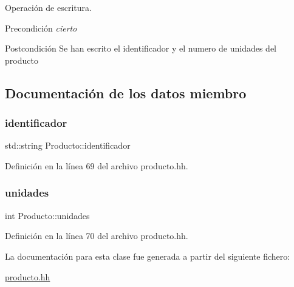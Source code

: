 Operación de escritura. 

\begin{DoxyPrecond}{Precondición}
{\itshape cierto} 
\end{DoxyPrecond}
\begin{DoxyPostcond}{Postcondición}
Se han escrito el identificador y el numero de unidades del producto 
\end{DoxyPostcond}


\subsection{Documentación de los datos miembro}
\mbox{\label{class_producto_a522892e64ad72444f1976ae86b2c2816}} 
\subsubsection{\texorpdfstring{identificador}{identificador}}
{\footnotesize\ttfamily std\+::string Producto\+::identificador\hspace{0.3cm}{\ttfamily [private]}}



Definición en la línea 69 del archivo producto.\+hh.

\mbox{\label{class_producto_a391646f51e9bbbd3cf22abdbd74eaac6}} 
\subsubsection{\texorpdfstring{unidades}{unidades}}
{\footnotesize\ttfamily int Producto\+::unidades\hspace{0.3cm}{\ttfamily [private]}}



Definición en la línea 70 del archivo producto.\+hh.



La documentación para esta clase fue generada a partir del siguiente fichero\+:\begin{DoxyCompactItemize}
\item 
\mbox{\hyperlink{producto_8hh}{producto.\+hh}}\end{DoxyCompactItemize}
